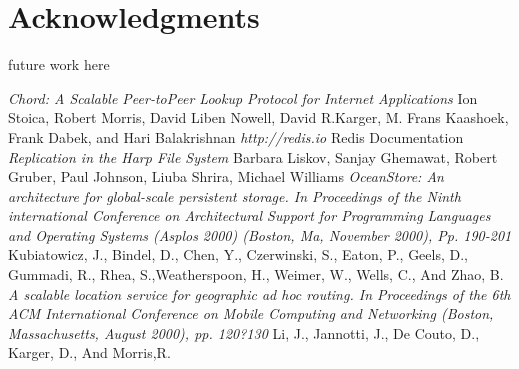 \documentclass[10pt,twocolumn,letterpaper]{article}
\begin{document}
\section{Acknowledgments} \label{acknowledgments}
future work here

\begin{thebibliography}{9}
 \emph{Chord: A Scalable Peer-toPeer Lookup Protocol for Internet Applications}  Ion Stoica, Robert Morris, David Liben Nowell, David R.Karger, M. Frans Kaashoek, Frank Dabek, and Hari Balakrishnan
 \emph{http://redis.io} Redis Documentation
 \emph{Replication in the Harp File System}  Barbara Liskov, Sanjay Ghemawat, Robert Gruber, Paul Johnson, Liuba Shrira, Michael Williams
 \emph{OceanStore: An architecture for global-scale persistent storage. In Proceedings of the Ninth international Conference on Architectural Support for Programming Languages and Operating Systems (Asplos 2000) (Boston, Ma, November 2000), Pp. 190-201} Kubiatowicz, J., Bindel, D., Chen, Y., Czerwinski, S.,
Eaton, P., Geels, D., Gummadi, R., Rhea, S.,Weatherspoon, H., Weimer, W., Wells, C., And Zhao, B.
 \emph{A scalable location service for geographic ad hoc routing. In Proceedings of the 6th ACM International Conference on Mobile Computing and Networking (Boston, Massachusetts, August 2000), pp. 120?130} Li, J., Jannotti, J., De Couto, D., Karger, D., And Morris,R.
\end{thebibliography}
{\small


} 
\end{document}
